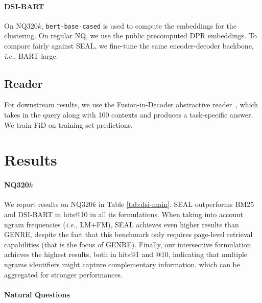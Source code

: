 \documentclass[11pt]{article}
\newcommand{\ie}{\textit{i.e.}}
\newcommand{\system}{\textsc{SEAL}}
\begin{document}
\paragraph{DSI-BART} On NQ320$k$, \texttt{bert-base-cased} is used to compute the embeddings for the clustering. On regular NQ, we use the public precomputed DPR embeddings. To compare fairly against \system{}, we fine-tune the same encoder-decoder backbone, \ie, BART large.

\subsection{Reader}
For downstream results, we use the Fusion-in-Decoder abstractive reader~\citep{izacard-grave-2021-leveraging}, which takes in the query along with 100 contexts and produces a task-specific answer. We train FiD on training set predictions.

\section{Results}
\paragraph{NQ320$k$}

We report results on NQ320$k$ in Table \ref{tab:dsi-main}. 
\system{} outperforms BM25 and DSI-BART in hits@10 in all its formulations. When taking into account ngram frequencies (\ie, LM+FM), \system{} achieves even higher results than GENRE, despite the fact that this benchmark only requires page-level retrieval capabilities (that is the focus of GENRE).  Finally, our intersective formulation achieves the highest results, both in hits@1 and @10, indicating that multiple ngrams identifiers might capture complementary information, which can be aggregated for stronger performances.





\paragraph{Natural Questions}
\end{document}
